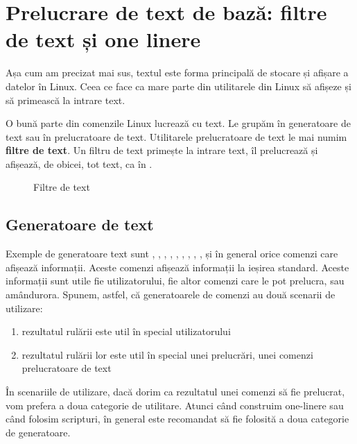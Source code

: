 \section{Prelucrare de text de bază: filtre de text și one linere}
\label{sec:cli:basic-proc}

Așa cum am precizat mai sus, textul este forma principală de stocare și afișare
a datelor în Linux. Ceea ce face ca mare parte din utilitarele din Linux să
afișeze și să primească la intrare text.

O bună parte din comenzile Linux lucrează cu text. Le grupăm în generatoare de
text sau în prelucratoare de text. Utilitarele prelucratoare de text le mai
numim \textbf{filtre de text}. Un filtru de text primește la intrare text, îl prelucrează
și afișează, de obicei, tot text, ca în .

\begin{figure}[htbp]
  \centering
  \def\svgwidth{0.8\columnwidth}
  
  \caption{Filtre de text}
  \label{fig:cli:text-filters}
\end{figure}

\subsection{Generatoare de text}
\label{sec:cli:basic-proc:gen}

Exemple de generatoare text sunt , , , , , , , , ,  și în general orice comenzi care afișează informații. Aceste comenzi afișează informații la ieșirea standard. Aceste informații sunt utile fie utilizatorului, fie altor comenzi care le pot prelucra, sau amândurora. Spunem, astfel, că generatoarele de comenzi au două scenarii de utilizare:

\begin{enumerate}
  \item rezultatul rulării este util în special utilizatorului
  \item rezultatul rulării lor este util în special unei prelucrări, unei comenzi prelucratoare de text
\end{enumerate}

În scenariile de utilizare, dacă dorim ca rezultatul unei comenzi să fie prelucrat, vom prefera a
doua categorie de utilitare. Atunci când construim one-linere sau când folosim
scripturi, în general este recomandat să fie folosită a doua categorie de
generatoare.


